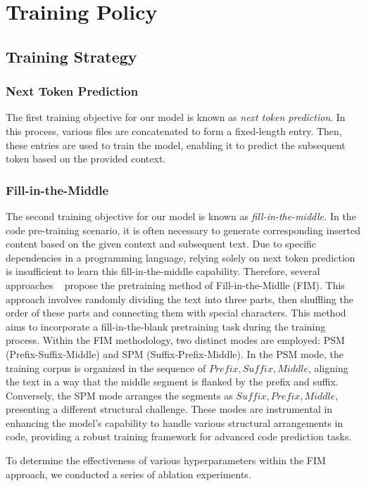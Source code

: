 \section{Training Policy}

\subsection{Training Strategy}
\subsubsection{Next Token Prediction} The first training objective for our model is known as \textit{next token prediction}. In this process, various files are concatenated to form a fixed-length entry. Then, these entries are used to train the model, enabling it to predict the subsequent token based on the provided context.

\subsubsection{Fill-in-the-Middle} 
The second training objective for our model is known as \textit{fill-in-the-middle.} In the code pre-training scenario, it is often necessary to generate corresponding inserted content based on the given context and subsequent text. Due to specific dependencies in a programming language, relying solely on next token prediction is insufficient to learn this fill-in-the-middle capability. Therefore, several approaches ~\citep{bavarian2022efficient,li2023starcoder} propose the pretraining method of Fill-in-the-Midlle (FIM). This approach involves randomly dividing the text into three parts, then shuffling the order of these parts and connecting them with special characters. This method aims to incorporate a fill-in-the-blank pretraining task during the training process. Within the FIM methodology, two distinct modes are employed: PSM (Prefix-Suffix-Middle) and SPM (Suffix-Prefix-Middle). In the PSM mode, the training corpus is organized in the sequence of $Prefix, Suffix, Middle$, aligning the text in a way that the middle segment is flanked by the prefix and suffix. Conversely, the SPM mode arranges the segments as $Suffix, Prefix, Middle$, presenting a different structural challenge. These modes are instrumental in enhancing the model's capability to handle various structural arrangements in code, providing a robust training framework for advanced code prediction tasks.

To determine the effectiveness of various hyperparameters within the FIM approach, we conducted a series of ablation experiments.

